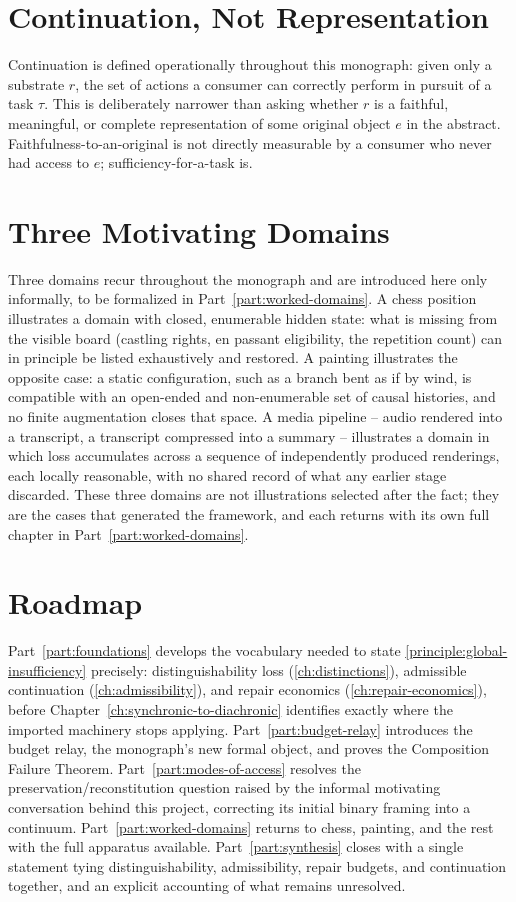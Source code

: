 \section{Continuation, Not Representation}

Continuation is defined operationally throughout this monograph: given
only a substrate $r$, the set of actions a consumer can correctly
perform in pursuit of a task $\tau$. This is deliberately narrower
than asking whether $r$ is a faithful, meaningful, or complete
representation of some original object $e$ in the abstract.
Faithfulness-to-an-original is not directly measurable by a consumer
who never had access to $e$; sufficiency-for-a-task is.

\section{Three Motivating Domains}

Three domains recur throughout the monograph and are introduced here
only informally, to be formalized in Part~\ref{part:worked-domains}.
A chess position illustrates a domain with closed, enumerable hidden
state: what is missing from the visible board (castling rights, en
passant eligibility, the repetition count) can in principle be listed
exhaustively and restored. A painting illustrates the opposite case: a
static configuration, such as a branch bent as if by wind, is
compatible with an open-ended and non-enumerable set of causal
histories, and no finite augmentation closes that space. A media
pipeline -- audio rendered into a transcript, a transcript compressed
into a summary -- illustrates a domain in which loss accumulates
across a sequence of independently produced renderings, each locally
reasonable, with no shared record of what any earlier stage discarded.
These three domains are not illustrations selected after the fact;
they are the cases that generated the framework, and each returns with
its own full chapter in Part~\ref{part:worked-domains}.

\section{Roadmap}

Part~\ref{part:foundations} develops the vocabulary needed to state
\cref{principle:global-insufficiency} precisely: distinguishability
loss (\cref{ch:distinctions}), admissible continuation
(\cref{ch:admissibility}), and repair economics
(\cref{ch:repair-economics}), before Chapter~\ref{ch:synchronic-to-diachronic}
identifies exactly where the imported machinery stops applying.
Part~\ref{part:budget-relay} introduces the budget relay, the
monograph's new formal object, and proves the Composition Failure
Theorem. Part~\ref{part:modes-of-access} resolves the
preservation/reconstitution question raised by the informal
motivating conversation behind this project, correcting its initial
binary framing into a continuum. Part~\ref{part:worked-domains}
returns to chess, painting, and the rest with the full apparatus
available. Part~\ref{part:synthesis} closes with a single statement
tying distinguishability, admissibility, repair budgets, and
continuation together, and an explicit accounting of what remains
unresolved.
